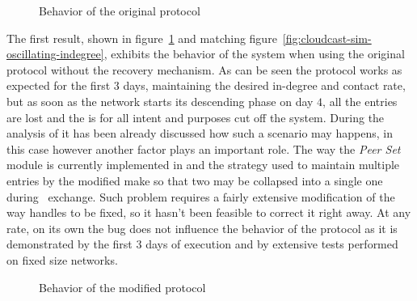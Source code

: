 \begin{figure}[h!]
  \centering
  \caption{Behavior of the original \peersampling protocol}
  \label{fig:cloudcast-dynamic-original}
\end{figure}


The first result, shown in figure~\ref{fig:cloudcast-dynamic-original}
and matching figure~\ref{fig:cloudcast-sim-oscillating-indegree},
exhibits the behavior of the system when using the original protocol
without the recovery mechanism. As can be seen the protocol works as
expected for the first $3$ days, maintaining the desired \cloud
in-degree and contact rate, but as soon as the network starts its
descending phase on day $4$, all the \cloud entries are lost and the
\cloud is for all intent and purposes cut off the system. During the
analysis of \cloudcast it has been already discussed how such a scenario
may happens, in this case however another factor plays an important
role. The way the \emph{Peer Set} module is currently implemented in
\grapes and the strategy used to maintain multiple \cloud entries by
the modified \cyclon make so that two \cloud \descriptor may be
collapsed into a single one during \view\ exchange. Such problem
requires a fairly extensive modification of the way \grapes handles
\descriptors to be fixed, so it hasn't been feasible to correct it right
away. At any rate, on its own the bug does not influence the behavior of
the protocol as it is demonstrated by the first $3$ days of execution
and by extensive tests performed on fixed size networks.

\begin{figure}[h!]
  \centering
  \caption{Behavior of the modified \peersampling protocol}
  \label{fig:cloudcast-dynamic-additions}
\end{figure}


